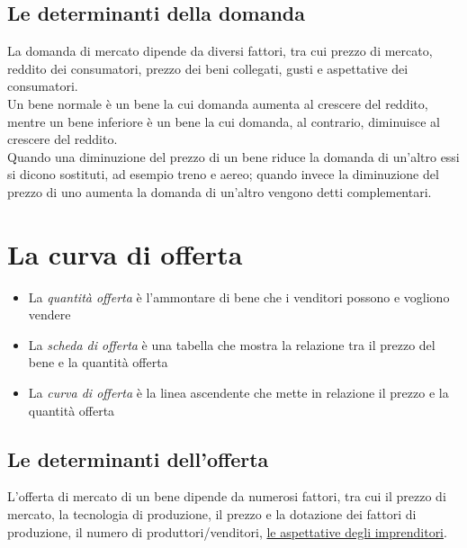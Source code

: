 \documentclass{report}
\begin{document}
	\subsection{Le determinanti della domanda}
	La domanda di mercato dipende da diversi fattori, tra cui prezzo di mercato, reddito dei consumatori, prezzo dei beni collegati, gusti e aspettative dei consumatori.
	\medskip \\Un bene normale è un bene la cui domanda aumenta al crescere del reddito, mentre un bene inferiore è un bene la cui domanda, al contrario, diminuisce al crescere del reddito.
	\medskip \\Quando una diminuzione del prezzo di un bene riduce la domanda di un'altro essi si dicono sostituti, ad esempio treno e aereo; quando invece la diminuzione del prezzo di uno aumenta la domanda di un'altro vengono detti complementari.
	\section{La curva di offerta}
	\begin{itemize}
		\item La \textit{quantità offerta} è l'ammontare di bene che i venditori possono e vogliono vendere
		\item La \textit{scheda di offerta} è una tabella che mostra la relazione tra il prezzo del bene e la quantità offerta
		\item La \textit{curva di offerta} è la linea ascendente che mette in relazione il prezzo e la quantità offerta
	\end{itemize}
	\subsection{Le determinanti dell'offerta}
	L'offerta di mercato di un bene dipende da numerosi fattori, tra cui il prezzo di mercato, la tecnologia di produzione, il prezzo e la dotazione dei fattori di produzione, il numero di produttori/venditori, \underline{le aspettative degli imprenditori}.
\end{document}

